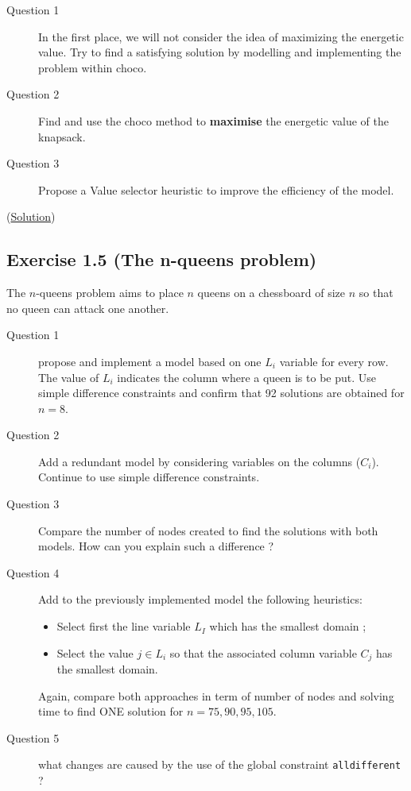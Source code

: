 \begin{description}
	\item[Question 1] In the first place, we will not consider the idea of maximizing the energetic value. Try to find a satisfying solution by modelling and implementing the problem within choco.
	\item[Question 2] Find and use the choco method to \textbf{maximise} the energetic value of the knapsack.
	\item[Question 3] Propose a Value selector heuristic to improve the efficiency of the model.
\end{description}

(\hyperlink{solutions:solutionofexercise1.4}{Solution})

\subsection{Exercise 1.5 (The n-queens problem)}\label{exercises:exercise1.5}\hypertarget{exercises:exercise1.5}{}
The $n$-queens problem aims to place $n$ queens on a chessboard of size $n$ so that no queen can attack one another.
\begin{description}
\item[Question 1] propose and implement a model based on one $L_{i}$ variable for every row. The value of $L_{i}$ indicates the column where a queen is to be put. Use simple difference constraints and confirm that 92 solutions are obtained for $n= 8$.
\item[Question 2] Add a redundant model by considering variables on the columns ($C_{i}$). Continue to use simple difference constraints.
\item[Question 3] Compare the number of nodes created to find the solutions with both models. How can you explain such a difference ?
\item[Question 4] Add to the previously implemented model the following heuristics:
  \begin{itemize}
  \item Select first the line variable $L_I$ which has the smallest domain ;
  \item Select the value $j\in L_i$ so that the associated column variable $C_j$ has the smallest domain.
  \end{itemize}
  Again, compare both approaches in term of number of nodes and solving time to find ONE solution for $n = 75, 90, 95, 105$.
\item[Question 5] what changes are caused by the use of the global constraint \texttt{alldifferent} ?
\end{description}


